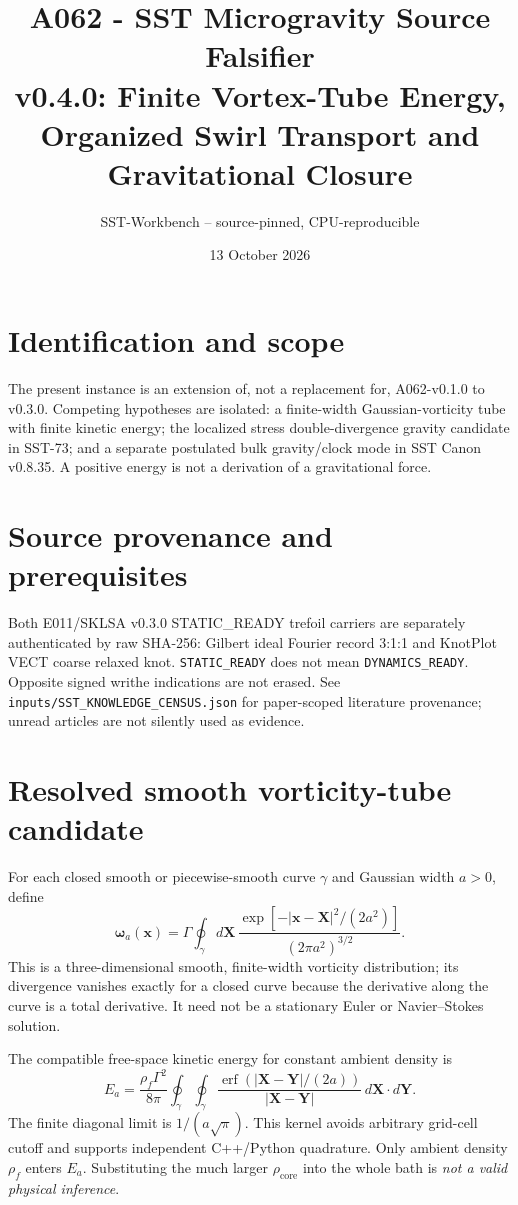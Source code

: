 \documentclass[10pt,a4paper]{article}
\title{A062 - SST Microgravity Source Falsifier\\
\large v0.4.0: Finite Vortex-Tube Energy, Organized Swirl Transport and Gravitational Closure}
\author{SST-Workbench -- source-pinned, CPU-reproducible}
\date{13 October 2026}
\begin{document}
\maketitle
\section{Identification and scope}
The present instance is an extension of, not a replacement for, A062-v0.1.0 to v0.3.0. Competing hypotheses are isolated: a finite-width Gaussian-vorticity tube with finite kinetic energy; the localized stress double-divergence gravity candidate in SST-73; and a separate postulated bulk gravity/clock mode in SST Canon v0.8.35. A positive energy is not a derivation of a gravitational force.
\section{Source provenance and prerequisites}
Both E011/SKLSA v0.3.0 STATIC\_READY trefoil carriers are separately authenticated by raw SHA-256: Gilbert ideal Fourier record 3:1:1 and KnotPlot VECT coarse relaxed knot. \texttt{STATIC\_READY} does not mean \texttt{DYNAMICS\_READY}. Opposite signed writhe indications are not erased. See \texttt{inputs/SST\_KNOWLEDGE\_CENSUS.json} for paper-scoped literature provenance; unread articles are not silently used as evidence.
\section{Resolved smooth vorticity-tube candidate}
For each closed smooth or piecewise-smooth curve $\gamma$ and Gaussian width $a>0$, define
\begin{equation}
\boldsymbol{\omega}_a(\mathbf{x}) =
\Gamma \oint_\gamma d\mathbf{X}\,
\frac{\exp[-|\mathbf{x}-\mathbf{X}|^2/(2a^2)]}{(2\pi a^2)^{3/2}}.
\end{equation}
This is a three-dimensional smooth, finite-width vorticity distribution; its divergence vanishes exactly for a closed curve because the derivative along the curve is a total derivative. It need not be a stationary Euler or Navier--Stokes solution.

The compatible free-space kinetic energy for constant ambient density is
\begin{equation}
E_a=\frac{\rho_f\Gamma^2}{8\pi}\oint_\gamma\oint_\gamma
\frac{\operatorname{erf}(|\mathbf{X}-\mathbf{Y}|/(2a))}
{|\mathbf{X}-\mathbf{Y}|}\,d\mathbf{X}\cdot d\mathbf{Y}.
\end{equation}
The finite diagonal limit is $1/(a\sqrt\pi)$. This kernel avoids arbitrary grid-cell cutoff and supports independent C++/Python quadrature. Only ambient density $\rho_f$ enters $E_a$. Substituting the much larger $\rho_{\mathrm{core}}$ into the whole bath is \emph{not a valid physical inference}.
\end{document}
